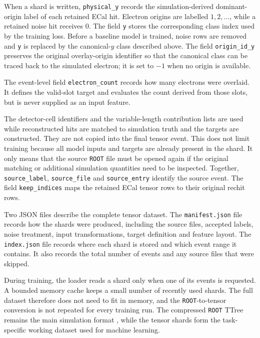 When a shard is written, \texttt{physical\_y} records the simulation-derived
dominant-origin label of each retained ECal hit. Electron origins are labelled
\(1,2,\ldots\), while a retained noise hit receives \(0\). The field
\texttt{y} stores the corresponding class index used by the training loss.
Before a baseline model is trained, noise rows are removed and
\texttt{y} is replaced by the canonical-\(y\) class described above. The
field \texttt{origin\_id\_y} preserves the original overlay-origin identifier
so that the canonical class can be traced back to the simulated electron; it
is set to \(-1\) when no origin is available.

The event-level field \texttt{electron\_count} records how many electrons were
overlaid. It defines the valid-slot target and evaluates the count derived
from those slots, but is never supplied as an input feature.

The detector-cell identifiers and the variable-length contribution lists are
used while reconstructed hits are matched to simulation truth and the targets
are constructed. They are not copied into the final tensor event. This does
not limit training because all model inputs and targets are already present
in the shard. It only means that the source \texttt{ROOT} file must be opened
again if the original matching or additional simulation quantities need to be
inspected. Together, \texttt{source\_label}, \texttt{source\_file} and
\texttt{source\_entry} identify the source event. The field
\texttt{keep\_indices} maps the retained ECal tensor rows to their original
\gls{rechit} rows.

Two JSON files describe the complete tensor dataset. The
\texttt{manifest.json} file records how the shards were produced, including
the source files, accepted labels, noise treatment, input transformations,
target definition and feature layout. The \texttt{index.json} file records
where each shard is stored and which event range it contains. It also records
the total number of events and any source files that were skipped.

During training, the loader reads a shard only when one of its events is
requested. A bounded memory cache keeps a small number of recently used
shards. The full dataset therefore does not need to fit in memory, and the
\texttt{ROOT}-to-tensor conversion is not repeated for every training run.
The compressed \texttt{ROOT} TTree remains the main simulation format
\cite{root_ttree}, while the tensor shards form the task-specific working
dataset used for machine learning.

